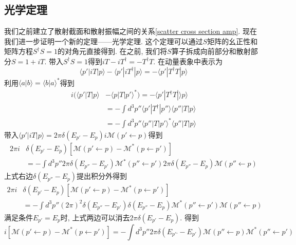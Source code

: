 \documentclass[a4paper,11pt]{book}
\begin{document}
\subsection{光学定理}
我们之前建立了散射截面和散射振幅之间的关系\eqref{scatter cross section amp}. 现在我们进一步证明一个新的定理——光学定理. 这个定理可以通过$S$矩阵的幺正性和矩阵方程$S^\dag S=1$的对角元直接得到. 在之前, 我们将$S$算子拆成向前部分和散射部分$S=1+iT$. 带入$S^\dag S=1$得到$iT-iT^\dag=-T^\dag T$. 在动量表象中表示为
\begin{equation*}
  \langle p'|iT|p\rangle-\langle p'|iT^\dag|p\rangle=-\langle p'|T^\dag T|p\rangle
\end{equation*}
利用$\langle a|b\rangle=\langle b|a\rangle^*$得到
\begin{equation*}
  \begin{split}
     i(\langle p'|T|p\rangle&-\langle p|T|p'\rangle^*)=-\langle p'|T^\dag T|\rangle p\rangle\\
       &=-\int d^3p''\langle p'|T^\dag|p''\rangle\langle p''|T|p\rangle\\
       &=-\int d^3p''\langle p''|T|p'\rangle^*\langle p''|T|p\rangle
  \end{split}
\end{equation*}
带入$\langle p'|iT|p\rangle=2\pi\delta(E_{p'}-E_p)i\mathcal{M}(p'\leftarrow p)$得到
\begin{equation*}
  \begin{split}
     2\pi i&\delta(E_{p'}-E_p)\left[\mathcal{M}(p'\leftarrow p)-\mathcal{M}^*(p\leftarrow p')\right]\\
       &=-\int d^3p''2\pi\delta(E_{p''}-E_{p'})\mathcal{M}^*(p''\leftarrow p')2\pi\delta(E_{p''}-E_p)\mathcal{M}(p''\leftarrow p)
  \end{split}
\end{equation*}
上式右边$\delta(E_{p''}-E_p)$提出积分外得到
\begin{equation*}
  \begin{split}
     2\pi i&\delta(E_{p'}-E_p)\left[\mathcal{M}(p'\leftarrow p)-\mathcal{M}^*(p\leftarrow p')\right]\\
     &=-\int d^3p''(2\pi)^2\delta(E_{p''}-E_{p'})\delta(E_{p''}-E_p)\mathcal{M}^*(p''\leftarrow p')\mathcal{M}(p''\leftarrow p)
  \end{split}
\end{equation*}
满足条件$E_{p'}=E_p$时, 上式两边可以消去$2\pi\delta(E_{p'}-E_p)$. 得到
\begin{equation*}
  i\left[\mathcal{M}(p'\leftarrow p)-\mathcal{M}^*(p\leftarrow p')\right]=-\int d^3 p''2\pi\delta(E_{p'‘}-E_{p'})\mathcal{M}(p''\leftarrow p)\mathcal{M}^*(p''\leftarrow p')
\end{equation*}
\end{document}
